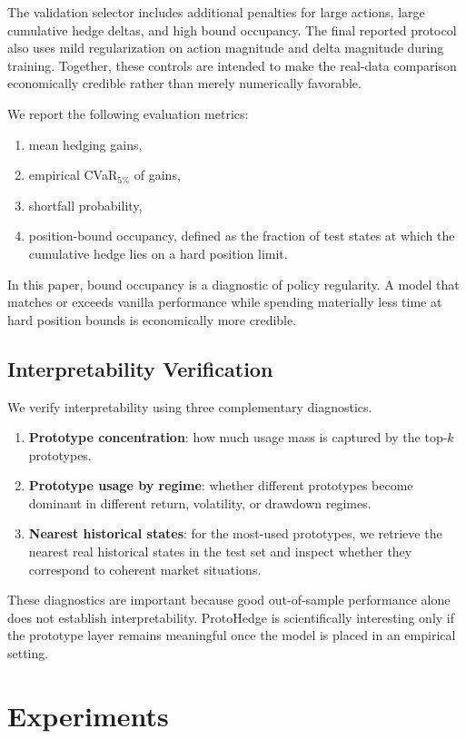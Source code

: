 \documentclass[11pt]{article}
\begin{document}
The validation selector includes additional penalties for large actions, large cumulative hedge deltas, and high bound occupancy. The final reported protocol also uses mild regularization on action magnitude and delta magnitude during training. Together, these controls are intended to make the real-data comparison economically credible rather than merely numerically favorable.

We report the following evaluation metrics:
\begin{enumerate}[leftmargin=1.5em]
    \item mean hedging gains,
    \item empirical CVaR$_{5\%}$ of gains,
    \item shortfall probability,
    \item position-bound occupancy, defined as the fraction of test states at which the cumulative hedge lies on a hard position limit.
\end{enumerate}
In this paper, bound occupancy is a diagnostic of policy regularity. A model that matches or exceeds vanilla performance while spending materially less time at hard position bounds is economically more credible.

\subsection{Interpretability Verification}
We verify interpretability using three complementary diagnostics.
\begin{enumerate}[leftmargin=1.5em]
    \item \textbf{Prototype concentration}: how much usage mass is captured by the top-$k$ prototypes.
    \item \textbf{Prototype usage by regime}: whether different prototypes become dominant in different return, volatility, or drawdown regimes.
    \item \textbf{Nearest historical states}: for the most-used prototypes, we retrieve the nearest real historical states in the test set and inspect whether they correspond to coherent market situations.
\end{enumerate}
These diagnostics are important because good out-of-sample performance alone does not establish interpretability. ProtoHedge is scientifically interesting only if the prototype layer remains meaningful once the model is placed in an empirical setting.

\section{Experiments}
\end{document}
